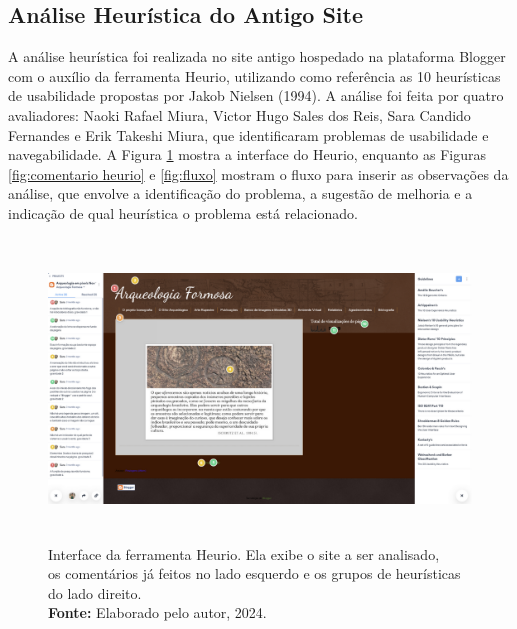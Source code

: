 \subsection{Análise Heurística do Antigo Site}
A análise heurística foi realizada no site antigo hospedado na plataforma Blogger com o auxílio da ferramenta Heurio, utilizando como referência as 10 heurísticas de usabilidade propostas por Jakob Nielsen (1994). A análise foi feita por quatro avaliadores: Naoki Rafael Miura, Victor Hugo Sales dos Reis, Sara Candido Fernandes e Erik Takeshi Miura, que identificaram problemas de usabilidade e navegabilidade.
A Figura \ref{fig:interface heurio} mostra a interface do Heurio, enquanto as Figuras \ref{fig:comentario heurio} e \ref{fig:fluxo} mostram o fluxo para inserir as observações da análise, que envolve a identificação do problema, a sugestão de melhoria e a indicação de qual heurística o problema está relacionado.
\begin{figure}[H]
    \centering
    \includegraphics[height=8cm, keepaspectratio]{img/heurio/interface heurio.png}
    \caption{ Interface da ferramenta Heurio. Ela exibe o site a ser analisado, \\ os comentários já feitos no lado esquerdo e os grupos de heurísticas do lado direito. \\
        \textbf{Fonte:} Elaborado pelo autor, 2024.}
    \label{fig:interface heurio}
\end{figure}


